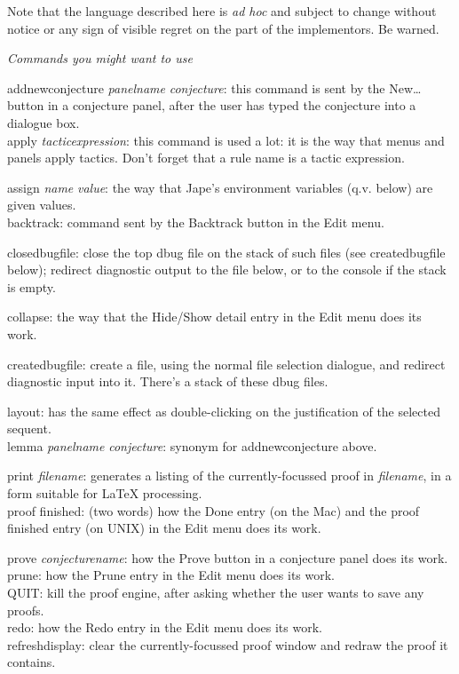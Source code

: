 \documentclass[11pt]{book}
\begin{document}
Note that the language described here is \textit{ad hoc} and subject to change without notice or any sign of visible regret on the part of the implementors. Be warned.


\textit{Commands you might want to use}


addnewconjecture \textit{panelname} \textit{conjecture}: this command is sent by the New\dots  button in a conjecture panel, after the user has typed the conjecture into a dialogue box.\\
apply \textit{tacticexpression}: this command is used a lot: it is the way that menus and panels apply tactics. Don't forget that a rule name is a tactic expression.


assign \textit{name} \textit{value}: the way that Jape's environment variables (q.v. below) are given values.\\
backtrack: command sent by the Backtrack button in the Edit menu.


closedbugfile: close the top dbug file on the stack of such files (see createdbugfile below); redirect diagnostic output to the file below, or to the console if the stack is empty.


collapse: the way that the Hide/Show detail entry in the Edit menu does its work.


createdbugfile: create a file, using the normal file selection dialogue, and redirect diagnostic input into it. There's a stack of these dbug files.


layout: has the same effect as double-clicking on the justification of the selected sequent.\\
lemma \textit{panelname} \textit{conjecture}: synonym for addnewconjecture above.


print \textit{filename}: generates a listing of the currently-focussed proof in \textit{filename}, in a form suitable for LaTeX processing.\\
proof finished: (two words) how the Done entry (on the Mac) and the proof finished entry (on UNIX) in the Edit menu does its work.


prove \textit{conjecturename}: how the Prove button in a conjecture panel does its work.\\
prune: how the Prune entry in the Edit menu does its work.\\
QUIT: kill the proof engine, after asking whether the user wants to save any proofs.\\
redo: how the Redo entry in the Edit menu does its work.\\
refreshdisplay: clear the currently-focussed proof window and redraw the proof it contains.
\end{document}
